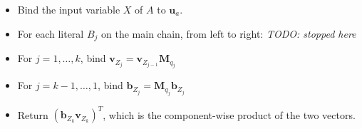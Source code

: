 \documentclass[12pt]{article}
\newcommand{\yy}[1]{\textit{TODO: {#1}}}
\newcommand{\vek}[1]{\textbf{#1}}
\newcommand{\M}{\textbf{M}}
\begin{document}
\begin{itemize}
\item Bind the input variable $X$ of $A$ to $\vek{u}_a$.
\item For each literal $B_j$ on the main chain, from left to right:
   \yy{stopped here}
\item For $j=1,\ldots,k$, bind $\vek{v}_{Z_j} = \vek{v}_{Z_{j-1}} \M_{q_j}$
\item For $j=k-1,\ldots,1$, bind $\vek{b}_{Z_j} = \M_{q_j} \vek{b}_{Z_j}$
\item Return $(\vek{b}_{Z_{k}} \vek{v}_{Z_{k}})^T$, which is the
  component-wise product of the two vectors.
\end{itemize}
\end{document}
